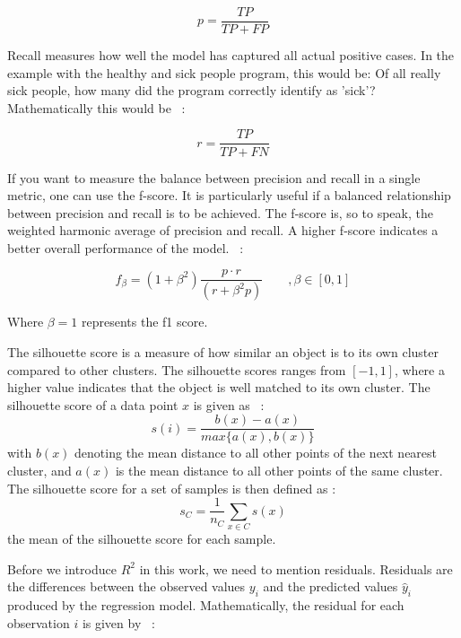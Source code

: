 \begin{equation}
    p = \frac{TP}{TP + FP}
\end{equation}

Recall measures how well the model has captured all actual positive cases. In the example with the healthy and sick people program, this would be: Of all really sick people, how many did the program correctly identify as 'sick'? Mathematically this would be ~\cite{10.1007/978-3-540-31865-1_25}: 

\begin{equation}
    r = \frac{TP}{TP + FN}  
\end{equation}

If you want to measure the balance between precision and recall in a single metric, one can use the f-score. It is particularly useful if a balanced relationship between precision and recall is to be achieved. The f-score is, so to speak, the weighted harmonic average of precision and recall. A higher f-score indicates a better overall performance of the model.
~\cite{10.1007/978-3-540-31865-1_25}:

\begin{equation}
    f_\beta = (1 + \beta^2) \frac{p \cdot r}{(r + \beta^2 p)} \qquad , \beta \in [0 , 1]
\end{equation}

Where $\beta = 1$ represents the f1 score.

The silhouette score is a measure of how similar an object is to its own cluster compared to other clusters. The silhouette scores ranges from $[-1 ,1]$, where a higher value indicates that the object is well matched to its own cluster. The silhouette score of a data point $x$ is given as ~\cite{SilhotteCoefficient}:
\begin{equation}
     s(i) = \frac{b(x) - a(x)}{max\{a(x),b(x)\}}
\end{equation}
with $b(x)$ denoting the mean distance to all other points of the next nearest cluster, and $a(x)$ is the mean distance to all other points of the same cluster. 
The silhouette score for a set of samples is then defined as :
\begin{equation}
    s_C = \frac{1}{n_C} \sum_{x \in C} s(x)
\end{equation}
the mean of the silhouette score for each sample.

Before we introduce \( R^2 \) in this work, we need to mention residuals. 
Residuals are the differences between the observed values \( y_i \) and the predicted values \( \hat{y}_i \) produced by the regression model. Mathematically, the residual for each observation \( i \) is given by ~\cite{Weisberg}:

